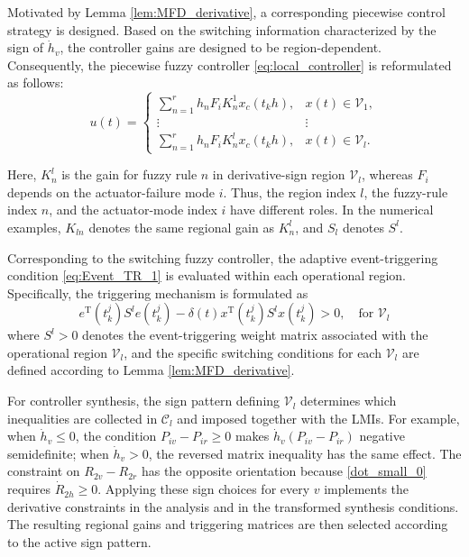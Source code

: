 \documentclass[preprint,review,fleqn,sort&compress,3p]{elsarticle}
\theoremstyle{definition} %
\theoremstyle{definition}%
\begin{document}
Motivated by Lemma \ref{lem:MFD_derivative}, a corresponding piecewise control strategy is designed. Based on the switching information characterized by the sign of $\dot h_v$, the controller gains are designed to be region-dependent. Consequently, the piecewise fuzzy controller \eqref{eq:local_controller} is reformulated as follows:
\begin{equation} \label{eq:switching_controller}
	u(t) =
	\begin{cases}
		\sum_{n=1}^{r} h_n F_i K_{n}^1 x_c(t_k h), & x(t)\in \mathcal{V}_1, \\
		\vdots & \vdots \\
		\sum_{n=1}^{r} h_n F_i K_{n}^l x_c(t_k h), & x(t)\in \mathcal{V}_l.
	\end{cases}
\end{equation}

Here, $K_n^l$ is the gain for fuzzy rule $n$ in derivative-sign region $\mathcal V_l$, whereas $F_i$ depends on the actuator-failure mode $i$. Thus, the region index $l$, the fuzzy-rule index $n$, and the actuator-mode index $i$ have different roles. In the numerical examples, $K_{ln}$ denotes the same regional gain as $K_n^l$, and $S_l$ denotes $S^l$.

Corresponding to the switching fuzzy controller, the adaptive event-triggering condition \eqref{eq:Event_TR_1} is evaluated within each operational region. Specifically, the triggering mechanism is formulated as
\begin{equation} 
 e^{\mathrm{T}}(t^j_{k}) S^l e(t^j_{k}) - \delta(t) x^{\mathrm{T}}(t_{k}^j) S^l x(t_{k}^j) > 0, \quad \text{for } \mathcal{V}_l
\end{equation}
where $S^l>0$ denotes the event-triggering weight matrix associated with the operational region $\mathcal{V}_l$, and the specific switching conditions for each $\mathcal{V}_l$ are defined according to Lemma \ref{lem:MFD_derivative}.

For controller synthesis, the sign pattern defining $\mathcal V_l$ determines which inequalities are collected in $\mathcal C_l$ and imposed together with the LMIs. For example, when $\dot h_v\leq0$, the condition $P_{iv}-P_{ir}\geq0$ makes $\dot h_v(P_{iv}-P_{ir})$ negative semidefinite; when $\dot h_v>0$, the reversed matrix inequality has the same effect. The constraint on $R_{2v}-R_{2r}$ has the opposite orientation because \eqref{dot_small_0} requires $\dot R_{2h}\geq0$. Applying these sign choices for every $v$ implements the derivative constraints in the analysis and in the transformed synthesis conditions. The resulting regional gains and triggering matrices are then selected according to the active sign pattern.
\end{document}
